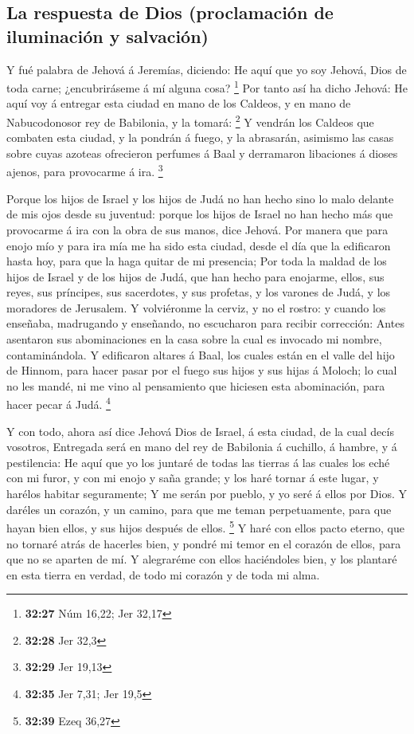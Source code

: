 \hypertarget{la-respuesta-de-dios-proclamaciuxf3n-de-iluminaciuxf3n-y-salvaciuxf3n}{%
\subsection{La respuesta de Dios (proclamación de iluminación y
salvación)}\label{la-respuesta-de-dios-proclamaciuxf3n-de-iluminaciuxf3n-y-salvaciuxf3n}}

 Y fué palabra de Jehová á Jeremías, diciendo:
 He aquí que yo soy Jehová, Dios de toda carne;
¿encubriráseme á mí alguna cosa? \footnote{\textbf{32:27} Núm 16,22; Jer
  32,17}  Por tanto así ha dicho Jehová: He aquí voy á
entregar esta ciudad en mano de los Caldeos, y en mano de Nabucodonosor
rey de Babilonia, y la tomará: \footnote{\textbf{32:28} Jer 32,3}
 Y vendrán los Caldeos que combaten esta ciudad, y la
pondrán á fuego, y la abrasarán, asimismo las casas sobre cuyas azoteas
ofrecieron perfumes á Baal y derramaron libaciones á dioses ajenos, para
provocarme á ira. \footnote{\textbf{32:29} Jer 19,13}

 Porque los hijos de Israel y los hijos de Judá no han
hecho sino lo malo delante de mis ojos desde su juventud: porque los
hijos de Israel no han hecho más que provocarme á ira con la obra de sus
manos, dice Jehová.  Por manera que para enojo mío y para
ira mía me ha sido esta ciudad, desde el día que la edificaron hasta
hoy, para que la haga quitar de mi presencia;  Por toda la
maldad de los hijos de Israel y de los hijos de Judá, que han hecho para
enojarme, ellos, sus reyes, sus príncipes, sus sacerdotes, y sus
profetas, y los varones de Judá, y los moradores de Jerusalem.
 Y volviéronme la cerviz, y no el rostro: y cuando los
enseñaba, madrugando y enseñando, no escucharon para recibir corrección:
 Antes asentaron sus abominaciones en la casa sobre la cual
es invocado mi nombre, contaminándola.  Y edificaron
altares á Baal, los cuales están en el valle del hijo de Hinnom, para
hacer pasar por el fuego sus hijos y sus hijas á Moloch; lo cual no les
mandé, ni me vino al pensamiento que hiciesen esta abominación, para
hacer pecar á Judá. \footnote{\textbf{32:35} Jer 7,31; Jer 19,5}

 Y con todo, ahora así dice Jehová Dios de Israel, á esta
ciudad, de la cual decís vosotros, Entregada será en mano del rey de
Babilonia á cuchillo, á hambre, y á pestilencia:  He aquí
que yo los juntaré de todas las tierras á las cuales los eché con mi
furor, y con mi enojo y saña grande; y los haré tornar á este lugar, y
harélos habitar seguramente;  Y me serán por pueblo, y yo
seré á ellos por Dios.  Y daréles un corazón, y un camino,
para que me teman perpetuamente, para que hayan bien ellos, y sus hijos
después de ellos. \footnote{\textbf{32:39} Ezeq 36,27}  Y
haré con ellos pacto eterno, que no tornaré atrás de hacerles bien, y
pondré mi temor en el corazón de ellos, para que no se aparten de mí.
 Y alegraréme con ellos haciéndoles bien, y los plantaré en
esta tierra en verdad, de todo mi corazón y de toda mi alma.

